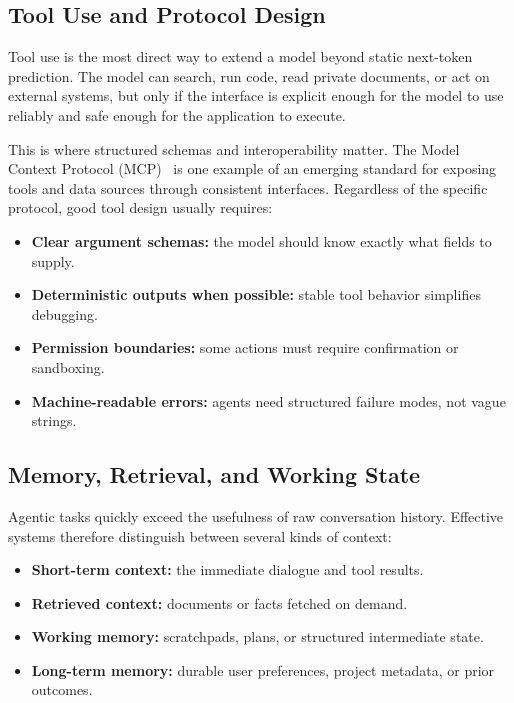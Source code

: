 \documentclass[class=article,crop=false]{standalone}
\begin{document}
\subsection{Tool Use and Protocol Design}
\label{sec:agents:tools}

Tool use is the most direct way to extend a model beyond static next-token prediction. The model can search, run code, read private documents, or act on external systems, but only if the interface is explicit enough for the model to use reliably and safe enough for the application to execute.

This is where structured schemas and interoperability matter. The Model Context Protocol (MCP)~\cite{mcp} is one example of an emerging standard for exposing tools and data sources through consistent interfaces. Regardless of the specific protocol, good tool design usually requires:
\begin{itemize}
  \item \textbf{Clear argument schemas:} the model should know exactly what fields to supply.
  \item \textbf{Deterministic outputs when possible:} stable tool behavior simplifies debugging.
  \item \textbf{Permission boundaries:} some actions must require confirmation or sandboxing.
  \item \textbf{Machine-readable errors:} agents need structured failure modes, not vague strings.
\end{itemize}

\subsection{Memory, Retrieval, and Working State}
\label{sec:agents:memory}

Agentic tasks quickly exceed the usefulness of raw conversation history. Effective systems therefore distinguish between several kinds of context:
\begin{itemize}
  \item \textbf{Short-term context:} the immediate dialogue and tool results.
  \item \textbf{Retrieved context:} documents or facts fetched on demand.
  \item \textbf{Working memory:} scratchpads, plans, or structured intermediate state.
  \item \textbf{Long-term memory:} durable user preferences, project metadata, or prior outcomes.
\end{itemize}
\end{document}
